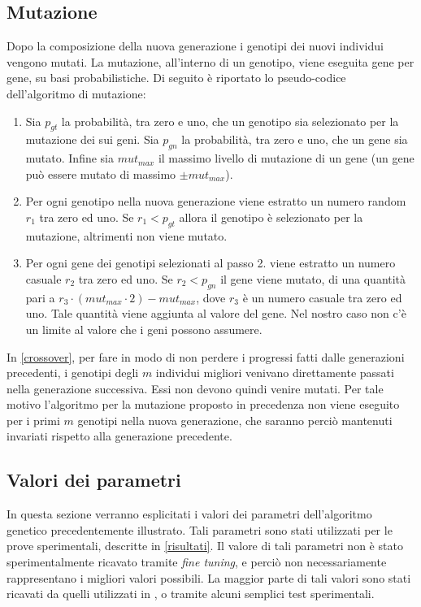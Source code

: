 \documentclass[a4paper,12pt]{article}
\begin{document}
\subsection*{Mutazione} \label{mutazione}
Dopo la composizione della nuova generazione i genotipi dei nuovi individui vengono mutati. La mutazione, all'interno di un genotipo, viene eseguita gene per gene, su basi probabilistiche. Di seguito è riportato lo pseudo-codice dell'algoritmo di mutazione:
\begin{enumerate}
	\item Sia $p_{gt}$ la probabilità, tra zero e uno, che un genotipo sia selezionato per la mutazione dei sui geni. Sia $p_{gn}$ la probabilità, tra zero e uno, che un gene sia mutato. Infine sia $mut_{max}$ il massimo livello di mutazione di un gene (un gene può essere mutato di massimo $\pm mut_{max}$).
	\item Per ogni genotipo nella nuova generazione viene estratto un numero random $r_1$ tra zero ed uno. Se $r_1 < p_{gt}$ allora il genotipo è selezionato per la mutazione, altrimenti non viene mutato.
	\item Per ogni gene dei genotipi selezionati al passo 2. viene estratto un numero casuale $r_2$ tra zero ed uno. Se $r_2 < p_{gn}$ il gene viene mutato, di una quantità pari a $r_3 \cdot (mut_{max} \cdot 2) - mut_{max}$, dove $r_3$ è un numero casuale tra zero ed uno. Tale quantità viene aggiunta al valore del gene. Nel nostro caso non c'è un limite al valore che i geni possono assumere. 
\end{enumerate}
In \autoref{crossover}, per fare in modo di non perdere i progressi fatti dalle generazioni precedenti, i genotipi degli $m$ individui migliori venivano direttamente passati nella generazione successiva. Essi non devono quindi venire mutati. Per tale motivo l'algoritmo per la mutazione proposto in precedenza non viene eseguito per i primi $m$ genotipi nella nuova generazione, che saranno perciò mantenuti invariati rispetto alla generazione precedente.
\subsection*{Valori dei parametri} \label{valore-dei-parametri}
In questa sezione verranno esplicitati i valori dei parametri dell'algoritmo genetico precedentemente illustrato. Tali parametri sono stati utilizzati per le prove sperimentali, descritte in \autoref{risultati}. Il valore di tali parametri non è stato sperimentalmente ricavato tramite \emph{fine tuning}, e perciò non necessariamente rappresentano i migliori valori possibili. La maggior parte di tali valori sono stati ricavati da quelli utilizzati in \cite{arztRepo}, o tramite alcuni semplici test sperimentali.
\end{document}
